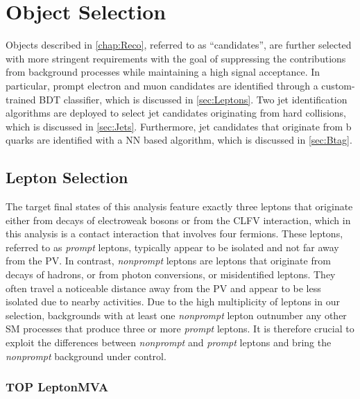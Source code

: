 \chapter{Object Selection}
\label{chap:Objects}

Objects described in \autoref{chap:Reco}, referred to as ``candidates'', are further selected with more stringent requirements with the goal of suppressing the contributions from background processes while maintaining a high signal acceptance. In particular, prompt electron and muon candidates are identified through a custom-trained \ac{BDT} classifier, which is discussed in \autoref{sec:Leptons}. Two jet identification algorithms are deployed to select jet candidates originating from hard collisions, which is discussed in  \autoref{sec:Jets}. Furthermore, jet candidates that originate from b quarks are identified with a \ac{NN} based algorithm, which is discussed in \autoref{sec:Btag}. 
\section{Lepton Selection}
\label{sec:Leptons}

The target final states of this analysis feature exactly three leptons that originate either from decays of electroweak bosons or from the \ac{CLFV} interaction, which in this analysis is a contact interaction that involves four fermions. These leptons, referred to as \emph{prompt} leptons, typically appear to be isolated and not far away from the \ac{PV}. In contrast, \emph{nonprompt} leptons are leptons that originate from decays of hadrons, or from photon conversions, or misidentified leptons. They often travel a noticeable distance away from the \ac{PV} and appear to be less isolated due to nearby activities. Due to the high multiplicity of leptons in our selection, backgrounds with at least one \emph{nonprompt} lepton outnumber any other \ac{SM} processes that produce three or more \emph{prompt} leptons. It is therefore crucial to exploit the differences between \emph{nonprompt} and \emph{prompt} leptons and bring the \emph{nonprompt} background under control. 
\subsection{TOP LeptonMVA}
\label{sec:TOPMVA}

